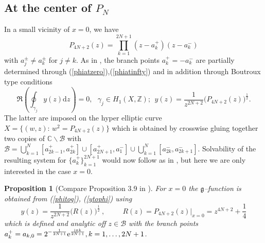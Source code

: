 \documentclass[10pt,reqno,oneside]{amsart}
\def \gg{{\mathfrak g}}
\renewcommand{\d}{{\mathrm d}}
\newcommand{\im}{\mathrm{i}}
\numberwithin{equation}{section}
\newtheorem{proposition}[theo]{Proposition}
\def\bp{\begin{proposition}}
\def\ep{\end{proposition}}
\def\eqref#1{(\ref{#1})}
\begin{document}
\subsection{At the center of $P_N$} In a small vicinity of $x=0$, we have
\begin{equation*}
	P_{4N+2}(z)=\prod_{k=1}^{2N+1}(z-a_k^+)(z-a_k^-)
\end{equation*}
with $a_j^{\pm}\neq a_k^{\pm}$ for $j\neq k$. As in \cite{BB}, the branch points $a_k^+=-a_k^-$ are partially determined through \eqref{phiatzero},\eqref{phiatinfty} and in addition through Boutroux  type conditions
\begin{equation*}
	\Re\left(\oint_{\gamma_j}y(z)\d z\right)=0,\ \ \ \gamma_j\in H_1(X,\mathbb{Z});\ \ y(z)=\frac{1}{z^{2N+2}}\big(P_{4N+2}(z)\big)^{\frac{1}{2}}.
\end{equation*}
The latter are imposed on the hyper elliptic curve $X=\{(w,z):\,w^2=P_{4N+2}(z)\}$ which is obtained by crosswise gluing together two copies of $\mathbb{C}\backslash\mathcal{B}$ with $\mathcal{B}=\bigcup_{k=1}^{N}[a_{2k-1}^+,a_{2k}^+]\cup[a_{2N+1}^+,a_1^-]\cup\bigcup_{k=1}^N[a_{2k}^-,a_{2k+1}^-]$. Solvability of the resulting system for $\{a_k^+\}_{k=1}^{2N+1}$ would now follow as in \cite{BB}, but here we are only interested in the case $x=0$.
\bp[Compare Proposition 3.9 in \cite{BB}]
\label{propgmax}
For $x=0$ the $\gg$--function is obtained from \eqref{phitog}, \eqref{ytophi} using  
\begin{equation*}
y(z) = \frac 1{z^{2N+2}} \big(R(z)\big)^{\frac{1}{2}}\ ,\ \ \qquad R(z) = P_{4N+2}(z)\Big|_{x=0}= z^{4N+2} + \frac 1 4
\end{equation*}
which is defined and analytic off $z\in\mathcal{B}$ with the branch points $a_{k}^+=a_{k,0} = 2^{-\frac 1{2N+1}}{\rm e}^{\frac {\im\pi k}{2N+1}},k=1,\ldots,2N+1$.
\ep
\end{document}

